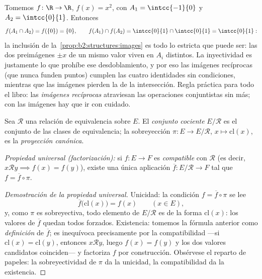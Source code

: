 \begin{example}\label{ex:b2:structures:imagestrict}
Tomemos $f \colon \R \to \R$, $f(x) = x^2$, con $A_1 =
\intcc{-1}{0}$ y $A_2 = \intcc{0}{1}$. Entonces
\[
f(A_1 \cap A_2) = f(\{0\}) = \{0\},
\qquad
f(A_1) \cap f(A_2) = \intcc{0}{1} \cap \intcc{0}{1} =
\intcc{0}{1} :
\]
la inclusión de la~\cref{prop:b2:structures:images} es todo lo
estricta que puede ser: las dos preimágenes $\pm x$ de un mismo
valor viven en $A_i$ distintos. La inyectividad es justamente lo
que prohíbe ese desdoblamiento, y por eso las imágenes recíprocas
(que nunca funden puntos) cumplen las cuatro identidades sin
condiciones, mientras que las imágenes pierden la de la
intersección. Regla práctica para todo el libro: las
\emph{imágenes recíprocas} atraviesan las operaciones
conjuntistas sin más; con las imágenes hay que ir con cuidado.
\end{example}

\begin{definition}\label{def:b2:structures:quotient}
Sea $\mathcal{R}$ una relación de equivalencia sobre $E$. El
\emph{conjunto cociente} $E/\mathcal{R}$ es
el conjunto de las clases de equivalencia; la sobreyección $\pi
\colon E \to E/\mathcal{R}$, $x \mapsto \mathrm{cl}(x)$, es la
\emph{proyección canónica}.

\emph{Propiedad universal (factorización):} si $f \colon E \to F$ es
\emph{compatible} con $\mathcal{R}$ (es decir, $x
\mathbin{\mathcal{R}} y \implies f(x) = f(y)$), existe una única
aplicación $\overline f \colon E/\mathcal{R} \to F$ tal que $f =
\overline f \circ \pi$.
\end{definition}

\begin{proof}[Demostración de la propiedad universal]
Unicidad: la condición $f = \overline f \circ \pi$ se lee
\[
\overline f\bigl(\mathrm{cl}(x)\bigr) = f(x)
\qquad (x \in E),
\]
y, como $\pi$ es sobreyectiva, todo elemento de $E/\mathcal{R}$
es de la forma $\mathrm{cl}(x)$: los valores de $\overline f$
quedan todos forzados. Existencia: tomemos la fórmula anterior
como \emph{definición} de $\overline f$; es inequívoca
precisamente por la compatibilidad ---si $\mathrm{cl}(x) =
\mathrm{cl}(y)$, entonces $x \mathbin{\mathcal{R}} y$, luego
$f(x) = f(y)$ y los dos valores candidatos coinciden--- y
factoriza $f$ por construcción. Obsérvese el reparto de papeles:
la sobreyectividad de $\pi$ da la unicidad, la compatibilidad da
la existencia.
\end{proof}

